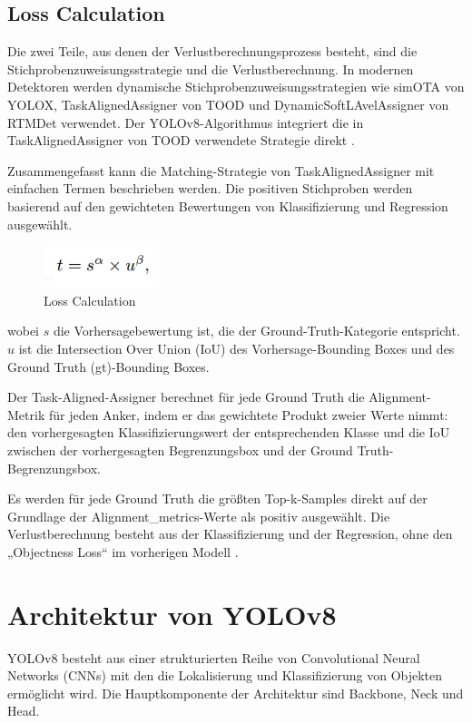 \documentclass[a4paper,12pt]{article}
\begin{document}
\subsection{Loss Calculation}
Die zwei Teile, aus denen der Verlustberechnungsprozess besteht, sind die Stichprobenzuweisungsstrategie und die Verlustberechnung. In modernen Detektoren werden dynamische Stichprobenzuweisungsstrategien wie simOTA von YOLOX, TaskAlignedAssigner von TOOD und DynamicSoftLAvelAssigner von RTMDet verwendet. Der YOLOv8-Algorithmus integriert die in TaskAlignedAssigner von TOOD verwendete Strategie direkt \cite{openmmlab2023dive}.

\noindent Zusammengefasst kann die Matching-Strategie von TaskAlignedAssigner mit einfachen Termen beschrieben werden. Die positiven Stichproben werden basierend auf den gewichteten Bewertungen von Klassifizierung und Regression ausgewählt.

\begin{figure}[h]
    \centering
    \includegraphics[width=0.3\textwidth]{Bild5.png}
    \caption{Loss Calculation}
    \label{fig:bild5}
\end{figure}

\noindent wobei $s$ die Vorhersagebewertung ist, die der Ground-Truth-Kategorie entspricht. $u$ ist die Intersection Over Union (IoU) des Vorhersage-Bounding Boxes und des Ground Truth (gt)-Bounding Boxes.

\noindent Der Task-Aligned-Assigner berechnet für jede Ground Truth die Alignment-Metrik für jeden Anker, indem er das gewichtete Produkt zweier Werte nimmt: den vorhergesagten Klassifizierungswert der entsprechenden Klasse und die IoU zwischen der vorhergesagten Begrenzungsbox und der Ground Truth-Begrenzungsbox.

\noindent Es werden für jede Ground Truth die größten Top-k-Samples direkt auf der Grundlage der Alignment\_metrics-Werte als positiv ausgewählt. Die Verlustberechnung besteht aus der Klassifizierung und der Regression, ohne den „Objectness Loss“ im vorherigen Modell \cite{openmmlab2023dive}.


\section{Architektur von YOLOv8}
YOLOv8 besteht aus einer strukturierten Reihe von Convolutional Neural Networks (CNNs) mit den die Lokalisierung und Klassifizierung von Objekten ermöglicht wird. Die Hauptkomponente der Architektur sind Backbone, Neck und Head.
\end{document}
